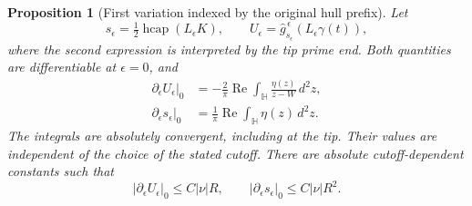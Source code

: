 \documentclass[11pt]{article}
\newtheorem{proposition}[theorem]{Proposition}
\theoremstyle{definition}\newtheorem{definition}[theorem]{Definition}
\theoremstyle{remark}\newtheorem{remark}[theorem]{Remark}
\begin{document}
\begin{proposition}[First variation indexed by the original hull prefix]
\label{prop:affine-prefix-variation}
Let
\[
 s_\epsilon=\tfrac12\operatorname{hcap}(L_\epsilon K),\qquad
 U_\epsilon=\widehat g^{\,\epsilon}_{s_\epsilon}
                   (L_\epsilon\gamma(t)),
 \tag{AV4}
\]
where the second expression is interpreted by the tip prime end.
Both quantities are differentiable at $\epsilon=0$, and
\[
 \boxed{\begin{aligned}
 \left.\partial_\epsilon U_\epsilon\right|_0
  &=-\frac2\pi\operatorname{Re}
       \int_{\mathbb H}\frac{\eta(z)}{z-W}\,d^2z,\\
 \left.\partial_\epsilon s_\epsilon\right|_0
  &=\frac1\pi\operatorname{Re}\int_{\mathbb H}\eta(z)\,d^2z.
 \end{aligned}}
 \tag{AV5}
\]
The integrals are absolutely convergent, including at the tip.
Their values are independent of the choice of the stated cutoff.
There are absolute cutoff-dependent constants such that
\[
 |\partial_\epsilon U_\epsilon|_0\le C|\nu|R,
 \qquad |\partial_\epsilon s_\epsilon|_0\le C|\nu|R^2.
 \tag{AV6}
\]
\end{proposition}
\end{document}
